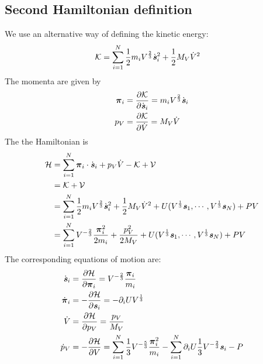 \documentclass[aps, pre, preprint,unsortedaddress,a4paper,onecolumn]{revtex4}
\newcommand{\vect}[1]{\textbf{\textit{#1}}}
\newcommand{\mypi}{\boldsymbol\pi}
\begin{document}
\subsection{Second Hamiltonian definition}
We use an alternative way of defining the kinetic energy:
\begin{align}
  \mathcal K &=
  \sum_{i=1}^N \frac12 m_i V^{\frac23}\dot{\vect s}_i^2
  +
  \frac 12 {M_V} \dot V^2 
\end{align}
The momenta are given by
\begin{align}
  \mypi_i
  &=
  \frac{\partial \mathcal K}{\partial\dot{\vect s}_i}
  =m_i V^{\frac23}\dot{\vect s}_i\\
  p_V
  &=
  \frac{\partial \mathcal K}{\partial\dot{V}}
  = {M_V}\dot V
\end{align}
The the Hamiltonian is
\begin{align}
  \mathcal H
  &=
  \sum_{i=1}^N\mypi_i\cdot \dot{\vect s}_i +
  p_V \dot V - \mathcal K + \mathcal V \\
  & =
  \mathcal K + \mathcal V \\
  &=
  \sum_{i=1}^N \frac12 m_i V^{\frac23}\dot{\vect s}_i^2
  +
  \frac 12 {M_V} \dot V^2  +
  U(V^{\frac13}\vect s_1, \cdots, V^{\frac13}\vect s_N) + PV    \\
  & =
  \sum_{i=1}^N V^{-\frac23} \frac{\mypi_i^2}{2m_i}
  +
  \frac{p_V^2}{2{M_V}}
  +
  U(V^{\frac13}\vect s_1, \cdots, V^{\frac13}\vect s_N) + PV      
\end{align}
The corresponding equations of motion are:
\begin{align}
  \dot{\vect s}_i
  &=
  \frac{\partial \mathcal H}{\partial \mypi_i}
  =
  V^{-\frac23} \frac{\mypi_i}{m_i} \\
  \dot{\mypi}_i
  &=
  -\frac{\partial \mathcal H}{\partial \vect s_i}
  = -\partial_i U V^{\frac13} \\
  \dot{V} 
  &=
  \frac{\partial \mathcal H}{\partial p_V}
  = \frac{p_V}{M_V} \\
  \dot{p}_V
  &=
  -\frac{\partial \mathcal H}{\partial V}
  =
  \sum_{i=1}^N \frac13 V^{-\frac53} \frac{\mypi_i^2}{m_i}
  -
  \sum_{i=1}^N \partial_i U \frac13 V^{-\frac23} \vect s_i
  - P
\end{align}
\end{document}
